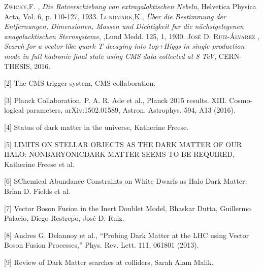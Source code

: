 \newpage



\begin{thebibliography}{X}
 \textsc{Zwicky,F.} ,
\textit{Die Rotverschiebung von extragalaktischen Nebeln}, Helvetica Physica Acta, Vol. 6, p. 110-127, 1933.
 \textsc{Lundmark,K.},
\textit{Über die Bestimmung der Entfernungen, Dimensionen, Massen und Dichtigkeit fur die nächstgelegenen anagalacktischen Sternsysteme},
,Lund Medd. 125, 1, 1930.
 \textsc{José D. Ruiz-Álvarez} ,
\textit{Search for a vector-like quark T decaying into top+Higgs in single production mode in full hadronic final state using CMS data collected at 8 TeV}, CERN-THESIS, 2016.

\end{thebibliography}



[2] The CMS trigger system, CMS collaboration.

\vspace{0.5cm}

[3] Planck Collaboration, P. A. R. Ade et al., Planck 2015 results. XIII. Cosmo-
logical parameters, arXiv:1502.01589, Astron. Astrophys. 594, A13 (2016).

\vspace{0.5cm}

[4] Status of dark matter in the universe, Katherine Freese.

\vspace{0.5cm}

[5] LIMITS ON STELLAR OBJECTS AS THE DARK MATTER OF OUR HALO: NONBARYONICDARK MATTER SEEMS TO BE REQUIRED, Katherine Freese et al.

\vspace{0.5cm}

[6] SChemical Abundance Constraints on White Dwarfs as Halo Dark Matter, Brian D. Fields et al.

\vspace{0.5cm}

[7] Vector Boson Fusion in the Inert Doublet Model, Bhaskar Dutta, Guillermo Palacio, Diego Restrepo, José D. Ruiz.

\vspace{0.5cm}

[8] Andres G. Delannoy et al., “Probing Dark Matter at the LHC using Vector Boson Fusion
Processes,” Phys. Rev. Lett. 111, 061801 (2013).

\vspace{0.5cm}

[9] Review of Dark Matter searches at colliders, Sarah Alam Malik.


